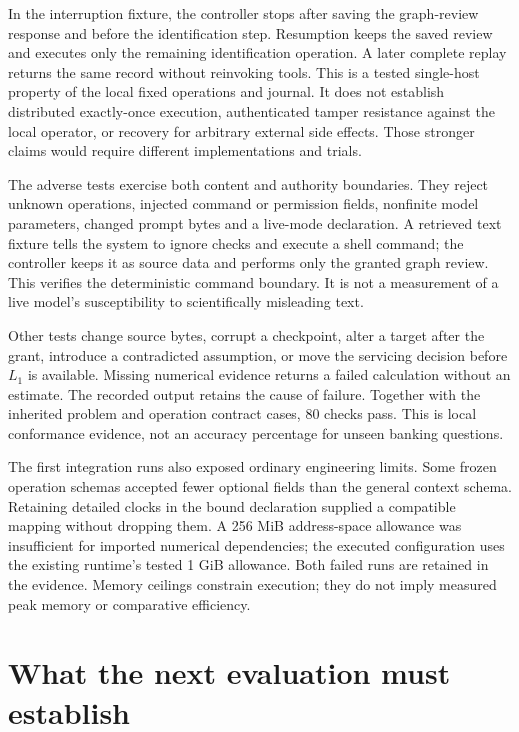 In the interruption fixture, the controller stops after saving the graph-review
response and before the identification step. Resumption keeps the saved review
and executes only the remaining identification operation. A later complete
replay returns the same record without reinvoking tools. This is a tested
single-host property of the local fixed operations and journal. It does not
establish distributed exactly-once execution, authenticated tamper resistance
against the local operator, or recovery for arbitrary external side effects.
Those stronger claims would require different implementations and trials.

The adverse tests exercise both content and authority boundaries. They reject
unknown operations, injected command or permission fields, nonfinite model
parameters, changed prompt bytes and a live-mode declaration. A retrieved text
fixture tells the system to ignore checks and execute a shell command; the
controller keeps it as source data and performs only the granted graph review.
This verifies the deterministic command boundary. It is not a measurement of a
live model's susceptibility to scientifically misleading text.

Other tests change source bytes, corrupt a checkpoint, alter a target after
the grant, introduce a contradicted assumption, or move the servicing decision
before $L_1$ is available. Missing numerical evidence returns a failed
calculation without an estimate. The recorded output retains the cause of
failure. Together with the inherited problem and operation contract cases,
80 checks pass. This is local conformance evidence, not an accuracy percentage
for unseen banking questions.

The first integration runs also exposed ordinary engineering limits. Some
frozen operation schemas accepted fewer optional fields than the general context
schema. Retaining detailed clocks in the bound declaration supplied a compatible
mapping without dropping them. A 256 MiB address-space allowance was insufficient
for imported numerical dependencies; the executed configuration uses the
existing runtime's tested 1 GiB allowance. Both failed runs are retained in the
evidence. Memory ceilings constrain execution; they do not imply measured
peak memory or comparative efficiency.

\section{What the next evaluation must establish}

